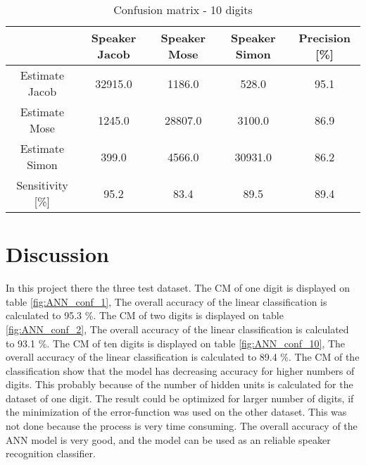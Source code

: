 \begin{table}[H]                                                    
\centering                                                          
\begin{tabular}{|c|c|c|c|c|}                                        
\hline                                                              
  & Speaker Jacob & Speaker Mose & Speaker Simon & Precision [\%] \\
\hline                                                              
Estimate Jacob & 32915.0 & 1186.0 & 528.0 & 95.1 \\                 
\hline                                                              
Estimate Mose & 1245.0 & 28807.0 & 3100.0 & 86.9 \\                 
\hline                                                              
Estimate Simon & 399.0 & 4566.0 & 30931.0 & 86.2 \\                 
\hline                                                              
Sensitivity [\%] & 95.2 & 83.4 & 89.5 & 89.4 \\                     
\hline                                                              
\end{tabular}                                                       
\caption{Confusion matrix - 10 digits}                              
\label{table:ANN_conf_10}                                           
\end{table}


\section{Discussion}
In this project there the three test dataset.
The CM of one digit is displayed on table \ref{fig:ANN_conf_1}, The overall accuracy of the linear classification is  calculated to 95.3 \%.
The CM of two digits is displayed on table \ref{fig:ANN_conf_2}, The overall accuracy of the linear classification is  calculated to 93.1 \%.
The CM of ten digits is displayed on table \ref{fig:ANN_conf_10}, The overall accuracy of the linear classification is  calculated to 89.4 \%.
The CM of the classification show that the model has decreasing accuracy for higher numbers of digits.
This probably because of the number of hidden units is calculated for the dataset of one digit.
The result could be optimized for larger number of digits, if the minimization of the  error-function was used on the other dataset.
This was not done because the process is very time consuming. 
The overall accuracy of the ANN model is very good, and the model can be used as an reliable speaker recognition classifier.    

